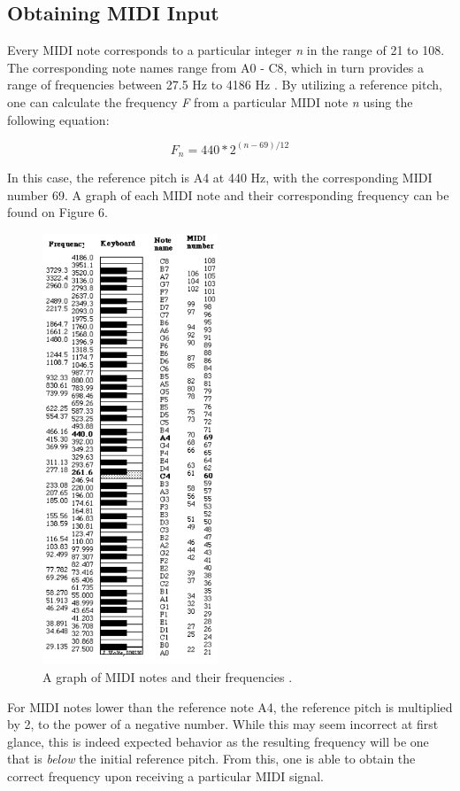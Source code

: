 \documentclass[12pt]{article}
\begin{document}
\subsection{Obtaining MIDI Input}
Every MIDI note corresponds to a particular integer \textit{n} in the range of 21 to 108. The corresponding note names range from A0 - C8, which in turn provides a range of frequencies between 27.5 Hz to 4186 Hz \cite{MIDI_online}. By utilizing a reference pitch, one can calculate the frequency \textit{F} from a particular MIDI note \textit{n} using the following equation:

$$ F_n = 440 * 2^{(n - 69) / 12} $$

In this case, the reference pitch is A4 at 440 Hz, with the corresponding MIDI number 69. A graph of each MIDI note and their corresponding frequency can be found on Figure 6.

\begin{figure}
	\includegraphics[width=5.25cm]{notes.png}
	\caption{A graph of MIDI notes and their frequencies \cite{MIDI_online}.}\label{wrap-fig:1}
\end{figure} 

For MIDI notes lower than the reference note A4, the reference pitch is multiplied by 2, to the power of a negative number. While this may seem incorrect at first glance, this is indeed expected behavior as the resulting frequency will be one that is \textit{below} the initial reference pitch. From this, one is able to obtain the correct frequency upon receiving a particular MIDI signal.
\end{document}
